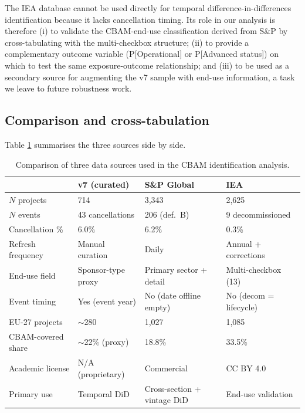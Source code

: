 \documentclass[11pt,a4paper]{article}
\begin{document}
The IEA database cannot be used directly for temporal difference-in-differences identification because it lacks cancellation timing. Its role in our analysis is therefore (i) to validate the CBAM-end-use classification derived from S\&P by cross-tabulating with the multi-checkbox structure; (ii) to provide a complementary outcome variable (P[Operational] or P[Advanced status]) on which to test the same exposure-outcome relationship; and (iii) to be used as a secondary source for augmenting the v7 sample with end-use information, a task we leave to future robustness work.

\subsection{Comparison and cross-tabulation}

Table \ref{tab:ch8-source-summary} summarises the three sources side by side.

\begin{table}[ht]
\centering
\caption{Comparison of three data sources used in the CBAM identification analysis.}
\label{tab:ch8-source-summary}
\small
\begin{tabular}{p{3.5cm}p{3.5cm}p{3.5cm}p{3.5cm}}
\toprule
& \textbf{v7 (curated)} & \textbf{S\&P Global} & \textbf{IEA} \\
\midrule
$N$ projects & 714 & 3{,}343 & 2{,}625 \\
$N$ events & 43 cancellations & 206 (def.\ B) & 9 decommissioned \\
Cancellation \% & 6.0\% & 6.2\% & 0.3\% \\
Refresh frequency & Manual curation & Daily & Annual + corrections \\
End-use field & Sponsor-type proxy & Primary sector + detail & Multi-checkbox (13) \\
Event timing & Yes (event year) & No (date offline empty) & No (decom = lifecycle) \\
EU-27 projects & $\sim$280 & 1{,}027 & 1{,}085 \\
CBAM-covered share & $\sim$22\% (proxy) & 18.8\% & 33.5\% \\
Academic license & N/A (proprietary) & Commercial & CC BY 4.0 \\
Primary use & Temporal DiD & Cross-section + vintage DiD & End-use validation \\
\bottomrule
\end{tabular}
\end{table}
\end{document}
